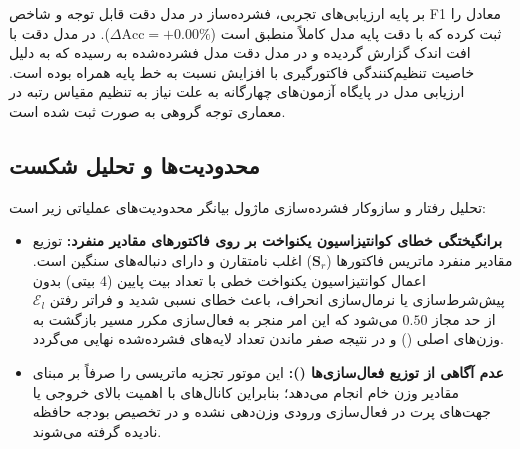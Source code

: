 بر پایه ارزیابی‌های تجربی، فشرده‌ساز  در مدل  دقت قابل توجه  و شاخص F1 معادل  را ثبت کرده که با دقت پایه مدل کاملاً منطبق است ($\Delta \text{Acc} = +0.00\%$). در مدل  دقت  با افت اندک  گزارش گردیده و در مدل  دقت مدل فشرده‌شده به  رسیده که به دلیل خاصیت تنظیم‌کنندگی فاکتورگیری با افزایش  نسبت به خط پایه همراه بوده است. ارزیابی مدل  در پایگاه آزمون‌های چهارگانه به علت نیاز به تنظیم مقیاس رتبه در معماری توجه گروهی  به صورت  ثبت شده است.

\subsection{محدودیت‌ها و تحلیل شکست}
تحلیل رفتار و سازوکار فشرده‌سازی ماژول  بیانگر محدودیت‌های عملیاتی زیر است:
\begin{itemize}
    \item \textbf{برانگیختگی خطای کوانتیزاسیون یکنواخت بر روی فاکتورهای مقادیر منفرد:} توزیع مقادیر منفرد ماتریس فاکتورها ($\mathbf{S}_r$) اغلب نامتقارن و دارای دنباله‌های سنگین است. اعمال کوانتیزاسیون یکنواخت خطی با تعداد بیت پایین ($4$ بیتی) بدون پیش‌شرط‌سازی یا نرمال‌سازی انحراف، باعث خطای نسبی شدید و فراتر رفتن $\mathcal{E}_l$ از حد مجاز $0.50$ می‌شود که این امر منجر به فعال‌سازی مکرر مسیر بازگشت به وزن‌های اصلی () و در نتیجه صفر ماندن تعداد لایه‌های فشرده‌شده نهایی می‌گردد.
    \item \textbf{عدم آگاهی از توزیع فعال‌سازی‌ها ():} این موتور تجزیه ماتریسی را صرفاً بر مبنای مقادیر وزن خام انجام می‌دهد؛ بنابراین کانال‌های با اهمیت بالای خروجی یا جهت‌های پرت در فعال‌سازی ورودی وزن‌دهی نشده و در تخصیص بودجه حافظه نادیده گرفته می‌شوند.
\end{itemize}
